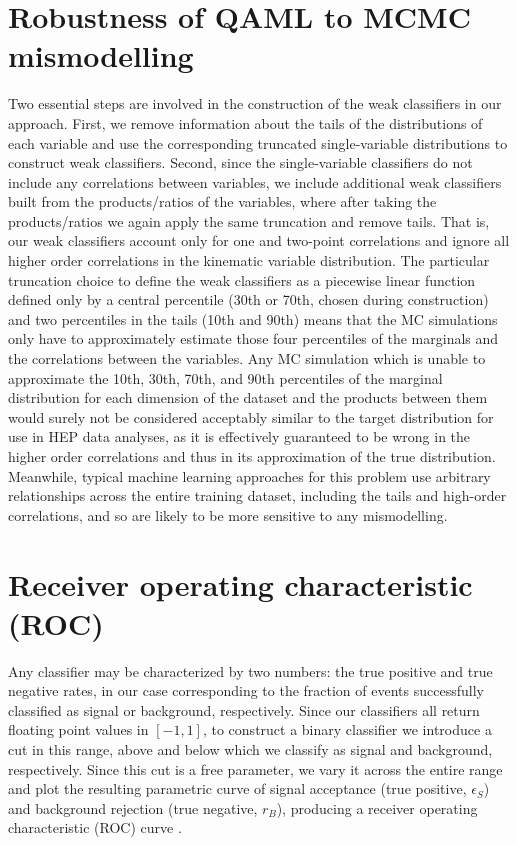 \section{Robustness of QAML to MCMC mismodelling}
Two essential steps are involved in the construction of the weak classifiers in our approach. First, we remove information about the tails of the distributions of each variable and use the corresponding truncated single-variable distributions to construct weak classifiers. Second, since the single-variable classifiers do not include any correlations between variables, we include additional weak classifiers built from the products/ratios of the variables, where after taking the products/ratios we again apply the same truncation and remove tails. That is, our weak classifiers account only for one and two-point correlations and ignore all higher order correlations in the kinematic variable distribution.
The particular truncation choice to define the weak classifiers as a piecewise linear function defined only by a central percentile (30th or 70th, chosen during construction) and two percentiles in the tails (10th and 90th) means that the MC simulations only have to approximately estimate those four percentiles of the marginals and the correlations between the variables. Any MC simulation which is unable to approximate the 10th, 30th, 70th, and 90th percentiles of the marginal distribution for each dimension of the dataset and the products between them would surely not be considered acceptably similar to the target distribution for use in HEP data analyses, as it is effectively guaranteed to be wrong in the higher order correlations and thus in its approximation of the true distribution. Meanwhile, typical machine learning approaches for this problem use arbitrary relationships across the entire training dataset, including the tails and high-order correlations, and so are likely to be more sensitive to any mismodelling.


\section{Receiver operating characteristic (ROC)}
Any classifier may be characterized by two numbers: the true positive and true negative rates, in our case corresponding to the fraction of events successfully classified as signal or background, respectively. Since our classifiers all return floating point values in $[-1,1]$, to construct a binary classifier we introduce a cut in this range, above and below which we classify as signal and background, respectively. Since this cut is a free parameter, we vary it across the entire range and plot the resulting parametric curve of signal acceptance (true positive, $\epsilon_S$) and background rejection (true negative, $r_B$), producing a receiver operating characteristic (ROC) curve \cite{Hanley:1982}. 


